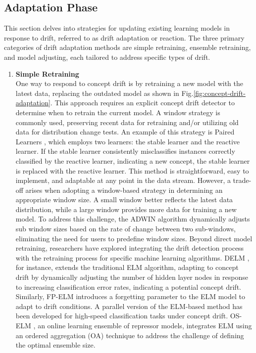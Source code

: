 \subsection{Adaptation Phase}
This section delves into strategies for updating existing learning models in response to drift, referred to as drift adaptation or reaction. The three primary categories of drift adaptation methods are simple retraining, ensemble retraining, and model adjusting, each tailored to address specific types of drift.

\begin{enumerate}[label=\Alph*.]
    \item \textbf{Simple Retraining} \\
    One way to respond to concept drift is by retraining a new model with the latest data, replacing the outdated model as shown in Fig.\ref{fig:concept-drift-adaptation}. This approach requires an explicit concept drift detector to determine when to retrain the current model. A window strategy is commonly used, preserving recent data for retraining and/or utilizing old data for distribution change tests. An example of this strategy is Paired Learners \cite{bach2008paired}, which employs two learners: the stable learner and the reactive learner. If the stable learner consistently misclassifies instances correctly classified by the reactive learner, indicating a new concept, the stable learner is replaced with the reactive learner. This method is straightforward, easy to implement, and adaptable at any point in the data stream.
    However, a trade-off arises when adopting a window-based strategy in determining an appropriate window size. A small window better reflects the latest data distribution, while a large window provides more data for training a new model. To address this challenge, the ADWIN algorithm \cite{bifet2007learning} dynamically adjusts sub window sizes based on the rate of change between two sub-windows, eliminating the need for users to predefine window sizes.
    Beyond direct model retraining, researchers have explored integrating the drift detection process with the retraining process for specific machine learning algorithms. DELM \cite{xu2017dynamic}, for instance, extends the traditional ELM algorithm, adapting to concept drift by dynamically adjusting the number of hidden layer nodes in response to increasing classification error rates, indicating a potential concept drift.
    Similarly, FP-ELM \cite{liu2016fp} introduces a forgetting parameter to the ELM model to adapt to drift conditions. A parallel version of the ELM-based method \cite{han2015efficient} has been developed for high-speed classification tasks under concept drift. OS-ELM \cite{soares2016adaptive}, an online learning ensemble of repressor models, integrates ELM using an ordered aggregation (OA) technique to address the challenge of defining the optimal ensemble size.

\end{enumerate}
